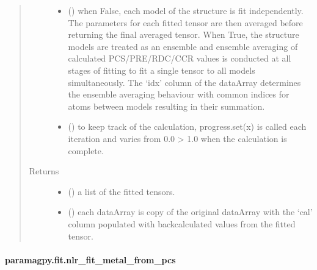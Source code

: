 \documentclass[a4paper,10pt,english,openany,oneside]{sphinxmanual}
\begin{document}
\begin{fulllineitems}
\begin{quote}
\begin{description}
\begin{itemize}
\item {} 
\sphinxAtStartPar
{} (\sphinxstyleliteralemphasis{\sphinxupquote{, }}) \textendash{} when False, each model of the structure is fit independently.
The parameters for each fitted tensor are then averaged before
returning the final averaged tensor.
When True, the structure models are treated as an ensemble and
ensemble averaging of calculated PCS/PRE/RDC/CCR values is
conducted at all stages of fitting to fit a single tensor to all
models simultaneously. The ‘idx’ column of the dataArray
determines the ensemble averaging behaviour with common indices
for atoms between models resulting in their summation.

\item {} 
\sphinxAtStartPar
{} (\sphinxstyleliteralemphasis{\sphinxupquote{, }}) \textendash{} to keep track of the calculation, progress.set(x) is called each
iteration and varies from 0.0 \sphinxhyphen{}\textgreater{} 1.0 when the calculation is complete.

\end{itemize}

\item[{Returns}] \leavevmode
\sphinxAtStartPar
\begin{itemize}
\item {} 
\sphinxAtStartPar
{} () \textendash{} a list of the fitted tensors.

\item {} 
\sphinxAtStartPar
{} () \textendash{} each dataArray is copy of the original dataArray with
the ‘cal’ column populated with back\sphinxhyphen{}calculated values from the
fitted tensor.

\end{itemize}


\end{description}\end{quote}

\end{fulllineitems}



\paragraph{paramagpy.fit.nlr\_fit\_metal\_from\_pcs}
\label{\detokenize{reference/generated/paramagpy.fit.nlr_fit_metal_from_pcs:paramagpy-fit-nlr-fit-metal-from-pcs}}\label{\detokenize{reference/generated/paramagpy.fit.nlr_fit_metal_from_pcs::doc}}
\end{document}

